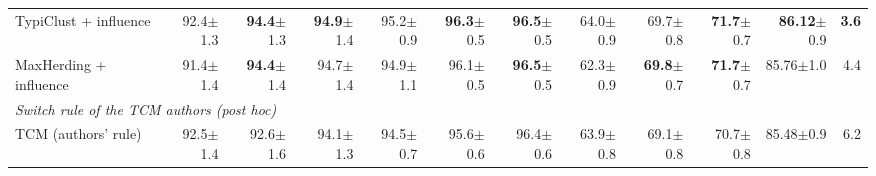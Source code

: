 \begin{table}[t]
\begin{adjustbox}{max width=\textwidth}
\begin{tabular}{lrrrrrrrrrrr}
\quad TypiClust + influence & 92.4{\scriptsize$\pm$1.3} & \textbf{94.4}{\scriptsize$\pm$1.3} & \textbf{94.9}{\scriptsize$\pm$1.4} & 95.2{\scriptsize$\pm$0.9} & \textbf{96.3}{\scriptsize$\pm$0.5} & \textbf{96.5}{\scriptsize$\pm$0.5} & 64.0{\scriptsize$\pm$0.9} & 69.7{\scriptsize$\pm$0.8} & \textbf{71.7}{\scriptsize$\pm$0.7} & \textbf{86.12}{\scriptsize$\pm$0.9} & \textbf{3.6} \\
\quad MaxHerding + influence & 91.4{\scriptsize$\pm$1.4} & \textbf{94.4}{\scriptsize$\pm$1.4} & 94.7{\scriptsize$\pm$1.4} & 94.9{\scriptsize$\pm$1.1} & 96.1{\scriptsize$\pm$0.5} & \textbf{96.5}{\scriptsize$\pm$0.5} & 62.3{\scriptsize$\pm$0.9} & \textbf{69.8}{\scriptsize$\pm$0.7} & \textbf{71.7}{\scriptsize$\pm$0.7} & 85.76{\scriptsize$\pm$1.0} & 4.4 \\
\multicolumn{12}{l}{\textit{Switch rule of the TCM authors (post hoc)}} \\
\quad TCM (authors' rule)~\cite{doucet2024bridging} & 92.5{\scriptsize$\pm$1.4} & 92.6{\scriptsize$\pm$1.6} & 94.1{\scriptsize$\pm$1.3} & 94.5{\scriptsize$\pm$0.7} & 95.6{\scriptsize$\pm$0.6} & 96.4{\scriptsize$\pm$0.6} & 63.9{\scriptsize$\pm$0.8} & 69.1{\scriptsize$\pm$0.8} & 70.7{\scriptsize$\pm$0.8} & 85.48{\scriptsize$\pm$0.9} & 6.2 \\
\bottomrule
\end{tabular}
\end{adjustbox}
\end{table}

